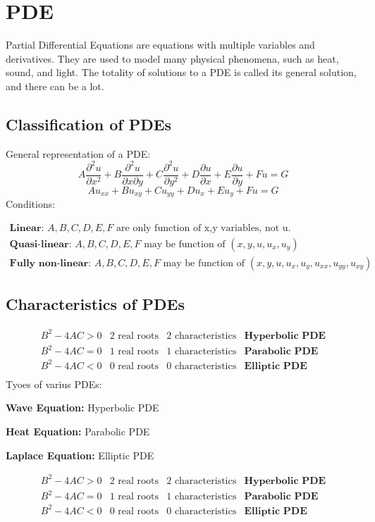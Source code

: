 \section{PDE}
Partial Differential Equations are equations with multiple variables and derivatives.
They are used to model many physical phenomena, such as heat, sound, and light.
The totality of solutions to a PDE is called its general solution, and there can be a lot.

\subsection{Classification of PDEs}
General representation of a PDE:
\[
  A\frac{\partial^2u}{\partial x^2}+B\frac{\partial^2u}{\partial x\partial y}+C\frac{\partial^2u}{\partial y^2}+D\frac{\partial u}{\partial x}+E\frac{\partial u}{\partial y}+Fu=G
\]
\[
  Au_{xx}+Bu_{xy}+Cu_{yy}+Du_x+Eu_y+Fu=G
\]
Conditions:

$$\begin{array}{l}
\textbf{Linear: }A,B,C,D,E,F \text{ are only function of x,y variables, not u.}\\
\textbf{Quasi-linear: }A,B,C,D,E,F \text{ may be function of } (x,y,u,u_x,u_y)\\
\textbf{Fully non-linear: }A,B,C,D,E,F \text{ may be function of } (x,y,u,u_x,u_y,u_{xx},u_{yy},u_{xy})
\end{array}$$

\subsection{Characteristics of PDEs}
$$\begin{array}{llll}
  B^2-4AC>0&2\text{ real roots}&2\text{ characteristics}&\textbf{Hyperbolic PDE}\\
  B^2-4AC=0&1\text{ real roots}&1\text{ characteristics}&\textbf{Parabolic PDE}\\
  B^2-4AC<0&0\text{ real roots}&0\text{ characteristics}&\textbf{Elliptic PDE}\\
\end{array}$$
Tyoes of varius PDEs:

\textbf{Wave Equation:} Hyperbolic PDE

\textbf{Heat Equation:} Parabolic PDE

\textbf{Laplace Equation:} Elliptic PDE


$$\begin{array}{llll}
  B^2-4AC>0&2\text{ real roots}&2\text{ characteristics}&\textbf{Hyperbolic PDE}\\
  B^2-4AC=0&1\text{ real roots}&1\text{ characteristics}&\textbf{Parabolic PDE}\\
  B^2-4AC<0&0\text{ real roots}&0\text{ characteristics}&\textbf{Elliptic PDE}\\
\end{array}$$

